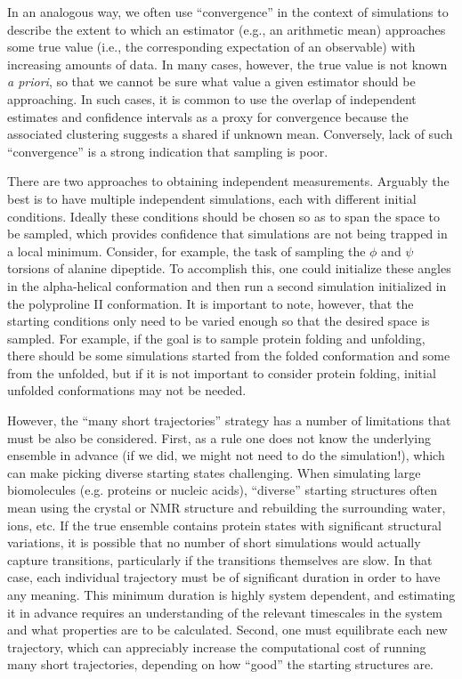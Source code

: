 In an analogous way, we often use ``convergence'' in the context of simulations to describe the extent to which an estimator (e.g., an arithmetic mean) approaches some true value (i.e., the corresponding expectation of an observable) with increasing amounts of data.  In many cases, however, the true value is not known {\it a priori}, so that we cannot be sure what value a given estimator should be approaching.  In such cases, it is common to use the overlap of independent estimates and confidence intervals as a proxy for convergence because the associated clustering suggests a shared if unknown mean.  Conversely, lack of such ``convergence'' is a strong indication that sampling is poor.


There are two approaches to obtaining independent measurements. Arguably the best is to have multiple independent simulations, each with different initial conditions. Ideally these conditions should be chosen so as to span the space to be sampled, which provides confidence that simulations are not being trapped in a local minimum. Consider, for example, the task of sampling the $\phi$ and $\psi$ torsions of alanine dipeptide.  To accomplish this, one could initialize these angles in the alpha-helical conformation and then run a second simulation initialized in the polyproline II conformation. It is important to note, however, that the starting conditions only need to be varied enough so that the desired space is sampled. For example, if the goal is to sample protein folding and unfolding, there should be some simulations started from the folded conformation and some from the unfolded, but if it is not important to consider protein folding, initial unfolded conformations may not be needed.

However, the ``many short trajectories'' strategy has a number of limitations that must be also be considered.  First, as a rule one does not know the underlying ensemble in advance (if we did, we might not need to do the simulation!), which can make picking diverse starting states challenging.  When simulating large biomolecules (e.g. proteins or nucleic acids), ``diverse'' starting structures often mean using the crystal or NMR structure and rebuilding the surrounding water, ions, etc.  If the true ensemble contains protein states with significant structural variations, it is possible that no number of short simulations would actually capture transitions, particularly if the transitions themselves are slow.  In that case, each individual trajectory must be of significant duration in order to have any meaning. This minimum duration is highly system dependent, and estimating it in advance requires an understanding of the relevant timescales in the system and what properties are to be calculated.  Second, one must equilibrate each new trajectory, which can appreciably increase the computational cost of running many short trajectories, depending on how ``good'' the starting structures are.

